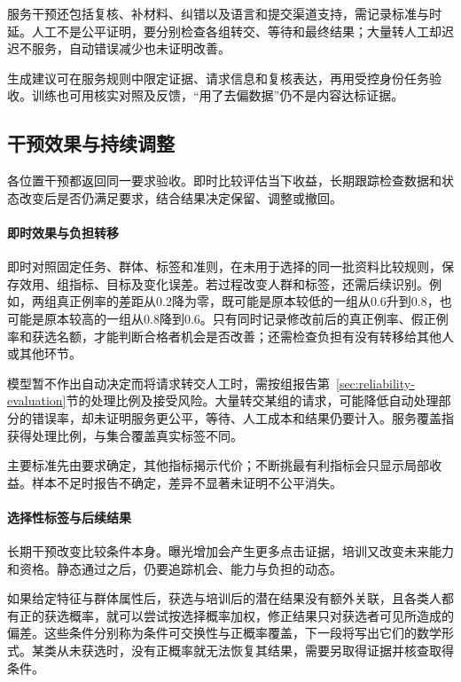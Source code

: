 服务干预还包括复核、补材料、纠错以及语言和提交渠道支持，需记录标准与时延。人工不是公平证明，要分别检查各组转交、等待和最终结果；大量转人工却迟迟不服务，自动错误减少也未证明改善。

生成建议可在服务规则中限定证据、请求信息和复核表达，再用受控身份任务验收。训练也可用核实对照及反馈，“用了去偏数据”仍不是内容达标证据。

\subsection{干预效果与持续调整}
\label{sec:fairness-intervention-evaluation}
\label{sec:fairness-long-term}

各位置干预都返回同一要求验收。即时比较评估当下收益，长期跟踪检查数据和状态改变后是否仍满足要求，结合结果决定保留、调整或撤回。

\paragraph{即时效果与负担转移}

即时对照固定任务、群体、标签和准则，在未用于选择的同一批资料比较规则，保存效用、组指标、目标及变化误差。若过程改变人群和标签，还需后续识别。例如，两组真正例率的差距从0.2降为零，既可能是原本较低的一组从0.6升到0.8，也可能是原本较高的一组从0.8降到0.6。只有同时记录修改前后的真正例率、假正例率和获选名额，才能判断合格者机会是否改善；还需检查负担有没有转移给其他人或其他环节。

模型暂不作出自动决定而将请求转交人工时，需按组报告第~\ref{sec:reliability-evaluation}节的处理比例及接受风险。大量转交某组的请求，可能降低自动处理部分的错误率，却未证明服务更公平，等待、人工成本和结果仍要计入。服务覆盖指获得处理比例，与集合覆盖真实标签不同。

主要标准先由要求确定，其他指标揭示代价；不断挑最有利指标会只显示局部收益。样本不足时报告不确定，差异不显著未证明不公平消失。

\paragraph{选择性标签与后续结果}

长期干预改变比较条件本身。曝光增加会产生更多点击证据，培训又改变未来能力和资格。静态通过之后，仍要追踪机会、能力与负担的动态。

如果给定特征与群体属性后，获选与培训后的潜在结果没有额外关联，且各类人都有正的获选概率，就可以尝试按选择概率加权，修正结果只对获选者可见所造成的偏差。这些条件分别称为条件可交换性与正概率覆盖，下一段将写出它们的数学形式。某类从未获选时，没有正概率就无法恢复其结果，需要另取得证据并核查取得条件。

